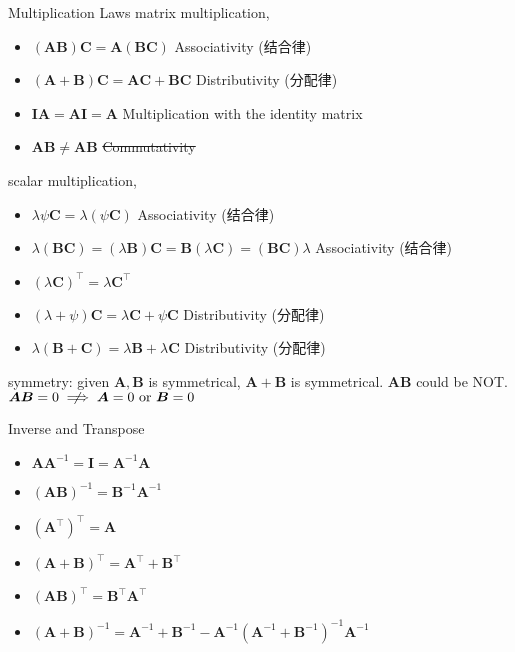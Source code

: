 \documentclass[UTF8,a4paper]{article}
\begin{document}
\begin{multicols}{3}

\begin{cheatsheetblock}{Multiplication Laws}
    matrix multiplication,
    \begin{itemize}
        \item $(\bm{A} \bm{B}) \bm{C} = \bm{A} (\bm{B} \bm{C})$ \hfill Associativity (结合律)
        \item $(\bm{A} + \bm{B}) \bm{C} = \bm{AC} + \bm{BC}$ \hfill Distributivity (分配律)
        \item $\bm{IA}=\bm{AI}=\bm{A}$ \hfill Multiplication with the identity matrix
        \item $\bm{AB} \neq \bm{AB}$ \hfill \sout{Commutativity}
    \end{itemize}
    scalar multiplication,
    \begin{itemize}
        \item $\lambda \psi \bm{C} = \lambda (\psi \bm{C})$ \hfill Associativity (结合律)
        \item $\lambda (\bm{BC}) = (\lambda \bm{B}) \bm{C} = \bm{B} (\lambda \bm{C}) = (\bm{BC})\lambda$ \hfill Associativity (结合律)
        \item $(\lambda \bm{C})^{\top} = \lambda \bm{C}^{\top}$
        \item $(\lambda + \psi) \bm{C} = \lambda\bm{C}+ \psi \bm{C}$  \hfill Distributivity (分配律)
        \item $\lambda (\bm{B} + \bm{C}) = \lambda\bm{B} +\lambda \bm{C}$  \hfill Distributivity (分配律)
    \end{itemize}
    symmetry: given $\bm{A}, \bm{B}$ is symmetrical, $\bm{A} + \bm{B}$ is symmetrical. $\bm{AB}$ could be NOT. \\
    $\bm{AB} = 0  \centernot\implies \bm{A} = 0 \text{ or } \bm{B} = 0$
\end{cheatsheetblock}

\begin{cheatsheetblock}{Inverse and Transpose}
    \begin{itemize}
        \item $\bm{A}\bm{A}^{-1} = \bm{I} = \bm{A}^{-1}\bm{A}$
        \item $(\bm{AB})^{-1} = \bm{B}^{-1} \bm{A}^{-1}$
        \item $(\bm{A}^{\top})^\top = \bm{A}$
        \item $(\bm{A} + \bm{B})^\top = \bm{A}^{\top} + \bm{B}^{\top}$
        \item $(\bm{AB})^{\top} = \bm{B}^{\top} \bm{A} ^{\top}$
        \item $(\bm{A} + \bm{B})^{-1} = \bm{A}^{-1} + \bm{B}^{-1} - \bm{A}^{-1} (\bm{A}^{-1} + \bm{B}^{-1})^{-1} \bm{A}^{-1}$
    \end{itemize}
\end{cheatsheetblock}


\end{multicols}
\end{document}
